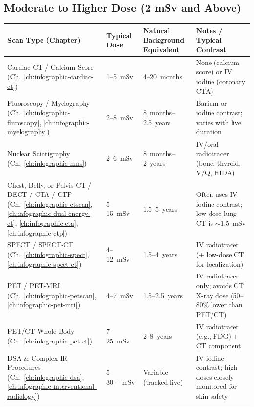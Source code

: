\subsection{Moderate to Higher Dose (2 mSv and Above)}
{\renewcommand{\arraystretch}{1.2}\noindent
\begin{tabularx}{\textwidth}{@{}p{} p{} p{} X@{}}
\toprule
\textbf{Scan Type (Chapter)} & \textbf{Typical Dose} & \textbf{Natural Background Equivalent} & \textbf{Notes / Typical Contrast} \\
\midrule
Cardiac CT / Calcium Score (Ch.~\ref{ch:infographic-cardiac-ct}) & 1--5~mSv & 4--20~months & None (calcium score) or IV iodine (coronary CTA) \\
Fluoroscopy / Myelography (Ch.~\ref{ch:infographic-fluroscopy}, \ref{ch:infographic-myelography}) & 2--8~mSv & 8~months--2.5~years & Barium or iodine contrast; varies with live duration \\
Nuclear Scintigraphy (Ch.~\ref{ch:infographic-nms}) & 2--6~mSv & 8~months--2~years & IV/oral radiotracer (bone, thyroid, V/Q, HIDA) \\
Chest, Belly, or Pelvis CT / DECT / CTA / CTP (Ch.~\ref{ch:infographic-ctscan}, \ref{ch:infographic-dual-energy-ct}, \ref{ch:infographic-cta}, \ref{ch:infographic-ctp}) & 5--15~mSv & 1.5--5~years & Often uses IV iodine contrast; low-dose lung CT is $\sim$1.5~mSv \\
SPECT / SPECT-CT (Ch.~\ref{ch:infographic-spect}, \ref{ch:infographic-spect-ct}) & 4--12~mSv & 1.5--4~years & IV radiotracer (+ low-dose CT for localization) \\
PET / PET-MRI (Ch.~\ref{ch:infographic-petscan}, \ref{ch:infographic-pet-mri}) & 4--7~mSv & 1.5--2.5~years & IV radiotracer only; avoids CT X-ray dose (50--80\% lower than PET/CT) \\
PET/CT Whole-Body (Ch.~\ref{ch:infographic-pet-ct}) & 7--25~mSv & 2--8~years & IV radiotracer (e.g., FDG) + CT component \\
DSA \& Complex IR Procedures (Ch.~\ref{ch:infographic-dsa}, \ref{ch:infographic-interventional-radiology}) & 5--30+~mSv & Variable (tracked live) & IV iodine contrast; high doses closely monitored for skin safety \\
\bottomrule
\end{tabularx}}

